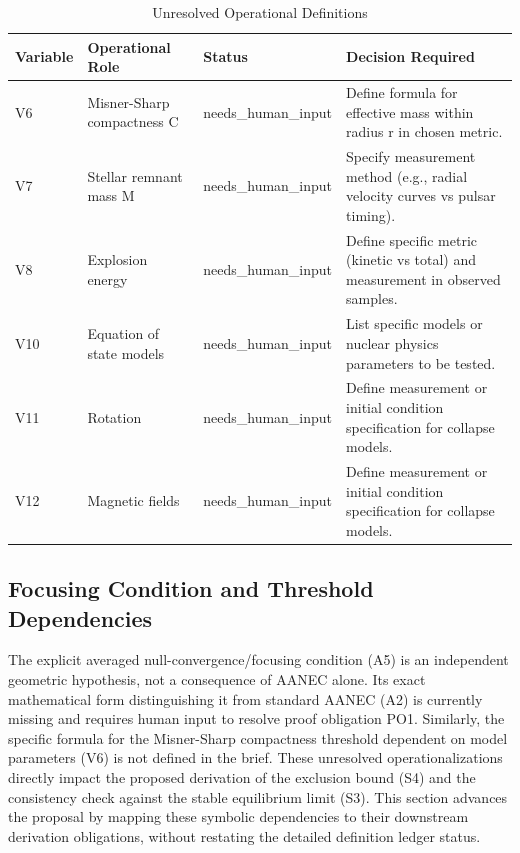 \documentclass[conference]{IEEEtran}
\begin{document}
\begin{table}[htbp]
\centering
\footnotesize
\setlength{\tabcolsep}{3pt}
\renewcommand{\arraystretch}{1.12}
\caption{Unresolved Operational Definitions}
\label{tab:appendix-variables-and-definitions-block-2}
\begin{tabular}{|p{}|p{}|p{}|p{}|}
\hline
Variable & Operational Role & Status & Decision Required \\\hline
V6 & Misner-Sharp compactness C & needs\_human\_input & Define formula for effective mass within radius r in chosen metric. \\\hline
V7 & Stellar remnant mass M & needs\_human\_input & Specify measurement method (e.g., radial velocity curves vs pulsar timing). \\\hline
V8 & Explosion energy & needs\_human\_input & Define specific metric (kinetic vs total) and measurement in observed samples. \\\hline
V10 & Equation of state models & needs\_human\_input & List specific models or nuclear physics parameters to be tested. \\\hline
V11 & Rotation & needs\_human\_input & Define measurement or initial condition specification for collapse models. \\\hline
V12 & Magnetic fields & needs\_human\_input & Define measurement or initial condition specification for collapse models. \\\hline
\end{tabular}
\end{table}

\subsection{Focusing Condition and Threshold Dependencies}
The explicit averaged null-convergence/focusing condition (A5) is an independent geometric hypothesis, not a consequence of AANEC alone. Its exact mathematical form distinguishing it from standard AANEC (A2) is currently missing and requires human input to resolve proof obligation PO1. Similarly, the specific formula for the Misner-Sharp compactness threshold dependent on model parameters (V6) is not defined in the brief. These unresolved operationalizations directly impact the proposed derivation of the exclusion bound (S4) and the consistency check against the stable equilibrium limit (S3). This section advances the proposal by mapping these symbolic dependencies to their downstream derivation obligations, without restating the detailed definition ledger status.
\end{document}
